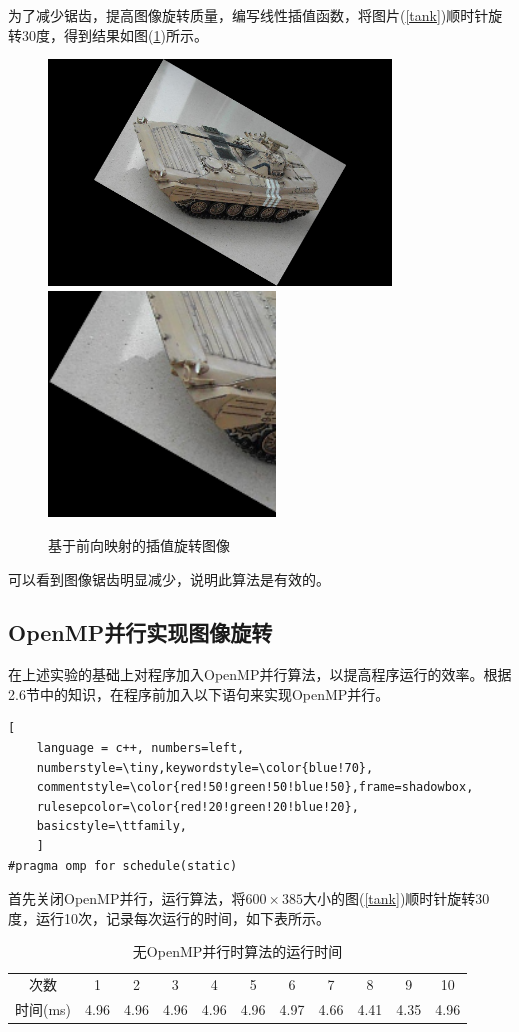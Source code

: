 \documentclass[UTF-8, a4paper, 12pt]{ctexart}
\begin{document}
为了减少锯齿，提高图像旋转质量，编写线性插值函数，将图片(\ref{tank})顺时针旋转30度，得到结果如图(\ref{t1})所示。
\begin{figure}[htbp]
    \centering
    \includegraphics[height=6cm]{fig/t1.bmp}
    \includegraphics[height=6cm]{fig/t12.bmp}
    \caption{基于前向映射的插值旋转图像}
    \label{t1}
\end{figure}
可以看到图像锯齿明显减少，说明此算法是有效的。


\subsection{OpenMP并行实现图像旋转}

在上述实验的基础上对程序加入OpenMP并行算法，以提高程序运行的效率。根据2.6节中的知识，在程序前加入以下语句来实现OpenMP并行。
\begin{lstlisting}[
	language = c++, numbers=left, 
	numberstyle=\tiny,keywordstyle=\color{blue!70},
	commentstyle=\color{red!50!green!50!blue!50},frame=shadowbox,
	rulesepcolor=\color{red!20!green!20!blue!20},
	basicstyle=\ttfamily,
	]
#pragma omp for schedule(static)
\end{lstlisting}

首先关闭OpenMP并行，运行算法，将$600\times 385$大小的图(\ref{tank})顺时针旋转30度，运行10次，记录每次运行的时间，如下表所示。
\begin{table}[htbp]
    \centering
    \caption{无OpenMP并行时算法的运行时间}
    \begin{tabular}{c|cccccccccc}
        \hline
        次数&1&2&3&4&5&6&7&8&9&10\\
        时间(ms)&4.96&4.96&4.96&4.96&4.96&4.97&4.66&4.41&4.35&4.96\\
        \hline
    \end{tabular}
\end{table}
\end{document}
